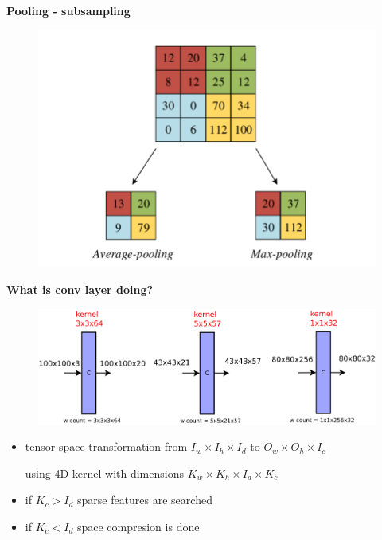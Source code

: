 \documentclass[xcolor=dvipsnames]{beamer}
\begin{document}
\begin{frame}{\bf Pooling - subsampling}

\begin{figure}
  \includegraphics[scale=0.2]{../../diagrams/pooling.png}
\end{figure}

\end{frame}

\begin{frame}{\bf What is conv layer doing?}

\begin{figure}
  \includegraphics[scale=0.25]{../../diagrams/nn/cnn_layer.png}
\end{figure}

\begin{itemize}
    \item tensor space transformation
        from $I_w\times I_h \times I_d$ to $O_w\times O_h \times I_c$

        using 4D kernel with dimensions $K_w \times K_h \times I_d \times K_c$

    \item if  $K_c > I_d$ sparse features are searched
    \item if  $K_c < I_d$ space compresion is done

\end{itemize}


\end{frame}
\end{document}
